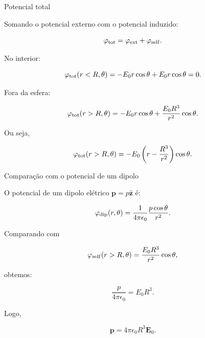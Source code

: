 \documentclass[aspectratio=169]{beamer}
\begin{document}
\begin{frame}{Potencial total}

\small

Somando o potencial externo com o potencial induzido:

\[
\varphi_{\rm tot}
=
\varphi_{\rm ext}
+
\varphi_{\rm self}.
\]

No interior:

\[
\varphi_{\rm tot}(r<R,\theta)
=
-E_0r\cos\theta
+
E_0r\cos\theta
=
0.
\]

Fora da esfera:

\begin{eqbox}
\begin{equation}
\varphi_{\rm tot}(r>R,\theta)
=
-E_0r\cos\theta
+
\frac{E_0R^3}{r^2}\cos\theta.
\label{eq:potencial-total-esfera}
\end{equation}
\end{eqbox}

Ou seja,

\[
\varphi_{\rm tot}(r>R,\theta)
=
-E_0
\left(
r-\frac{R^3}{r^2}
\right)
\cos\theta.
\]

\end{frame}

\begin{frame}{Comparação com o potencial de um dipolo}

\small

O potencial de um dipolo elétrico \(\mathbf p=p\hat{\mathbf z}\) é:

\begin{eqbox}
\begin{equation}
\varphi_{\rm dip}(r,\theta)
=
\frac{1}{4\pi\epsilon_0}
\frac{p\cos\theta}{r^2}.
\label{eq:potencial-dipolo}
\end{equation}
\end{eqbox}

Comparando com

\[
\varphi_{\rm self}(r>R,\theta)
=
\frac{E_0R^3}{r^2}\cos\theta,
\]

obtemos:

\[
\frac{p}{4\pi\epsilon_0}
=
E_0R^3.
\]

Logo,

\begin{eqbox}
\begin{equation}
\mathbf p
=
4\pi\epsilon_0 R^3\mathbf E_0.
\label{eq:dipolo-esfera}
\end{equation}
\end{eqbox}

\end{frame}
\end{document}
